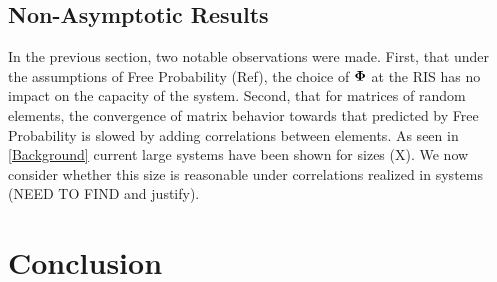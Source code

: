 \documentclass[12pt,a4paper]{report}
\begin{document}
\section{Non-Asymptotic Results}
In the previous section, two notable observations were made. First, that under the assumptions of Free Probability (Ref), the choice of $\boldsymbol{\Phi}$ at the 
RIS has no impact on the capacity of the system. Second, that for matrices of random elements, the  convergence of matrix behavior towards that predicted by Free Probability is slowed by adding correlations between elements. As seen in \ref{Background} current large systems have been shown for 
sizes (X). We now consider whether this size is reasonable under correlations realized in systems (NEED TO FIND and justify). 

\chapter{Conclusion}
\end{document}
